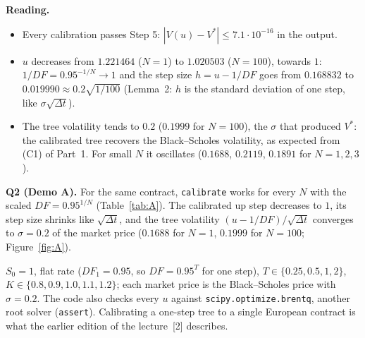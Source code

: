 \documentclass[11pt,a4paper]{article}
\newcommand{\ansbox}[1]{\begin{ansboxenv}#1\end{ansboxenv}}
\newcommand{\subhead}[1]{\par\medskip\noindent{\large\bfseries #1}\par\smallskip\noindent\ignorespaces}
\begin{document}
\par\medskip\noindent\textbf{Reading.}
\begin{itemize}
\item Every calibration passes Step 5: $|V(u)-V^*|\le7.1\cdot10^{-16}$ in the output.
\item $u$ decreases from $1.221464$ ($N=1$) to $1.020503$ ($N=100$), towards $1$: $1/DF=0.95^{-1/N}\to1$ and the step size $h=u-1/DF$ goes from $0.168832$ to $0.019990\approx0.2\sqrt{1/100}$ (Lemma~2: $h$ is the standard deviation of one step, like $\sigma\sqrt{\Delta t}$).
\item The tree volatility tends to $0.2$ ($0.1999$ for $N=100$), the $\sigma$ that produced $V^*$: the calibrated tree recovers the Black--Scholes volatility, as expected from (C1) of Part~1. For small $N$ it oscillates ($0.1688$, $0.2119$, $0.1891$ for $N=1,2,3$).
\end{itemize}

\ansbox{\textbf{Q2 (Demo A).} For the same contract, \texttt{calibrate} works for every $N$ with the scaled $DF=0.95^{1/N}$ (Table~\ref{tab:A}). The calibrated up step decreases to $1$, its step size shrinks like $\sqrt{\Delta t}$, and the tree volatility $(u-1/DF)/\sqrt{\Delta t}$ converges to $\sigma=0.2$ of the market price ($0.1688$ for $N=1$, $0.1999$ for $N=100$; Figure~\ref{fig:A}).}

\subhead{Q3 --- Demo B: one-step tree for several contracts.}
$S_0=1$, flat rate ($DF_1=0.95$, so $DF=0.95^{T}$ for one step), $T\in\{0.25,0.5,1,2\}$, $K\in\{0.8,0.9,1.0,1.1,1.2\}$; each market price is the Black--Scholes price with $\sigma=0.2$. The code also checks every $u$ against \texttt{scipy.optimize.brentq}, another root solver (\texttt{assert}). Calibrating a one-step tree to a single European contract is what the earlier edition of the lecture~[2] describes.

\begin{center}
\label{fig:fB}
\end{center}
\end{document}
